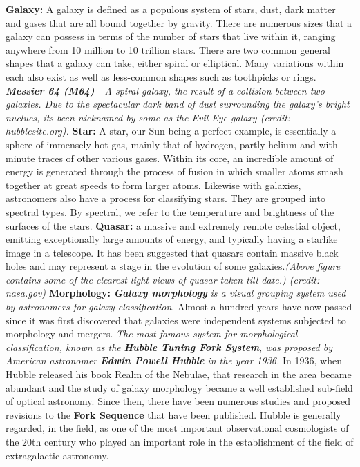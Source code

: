 \documentclass[11pt]{article}
\begin{document}
\textbf{Galaxy:} A galaxy is defined as a populous system of stars,
dust, dark matter and gases that are all bound together by gravity.
There are numerous sizes that a galaxy can possess in terms of the
number of stars that live within it, ranging anywhere from 10 million to
10 trillion stars. There are two common general shapes that a galaxy can
take, either spiral or elliptical. Many variations within each also
exist as well as less-common shapes such as toothpicks or rings.
\emph{\textbf{Messier 64 (M64)} - A spiral galaxy, the result of a
collision between two galaxies. Due to the spectacular dark band of dust
surrounding the galaxy's bright nuclues, its been nicknamed by some as
the Evil Eye galaxy (credit: hubblesite.org).} \textbf{Star:} A star,
our Sun being a perfect example, is essentially a sphere of immensely
hot gas, mainly that of hydrogen, partly helium and with minute traces
of other various gases. Within its core, an incredible amount of energy
is generated through the process of fusion in which smaller atoms smash
together at great speeds to form larger atoms. Likewise with galaxies,
astronomers also have a process for classifying stars. They are grouped
into spectral types. By spectral, we refer to the temperature and
brightness of the surfaces of the stars. \textbf{Quasar:} a massive and
extremely remote celestial object, emitting exceptionally large amounts
of energy, and typically having a starlike image in a telescope. It has
been suggested that quasars contain massive black holes and may
represent a stage in the evolution of some galaxies.\emph{(Above figure
contains some of the clearest light views of quasar taken till date.)
(credit: nasa.gov)} \textbf{Morphology:} \textbf{\emph{Galaxy
morphology}} \emph{is a visual grouping system used by astronomers for
galaxy classification}. Almost a hundred years have now passed since it
was first discovered that galaxies were independent systems subjected to
morphology and mergers. \emph{The most famous system for morphological
classification, known as the} \textbf{\emph{Hubble Tuning Fork System}},
\emph{was proposed by American astronomer \textbf{Edwin Powell Hubble}
in the year 1936.} In 1936, when Hubble released his book Realm of the
Nebulae, that research in the area became abundant and the study of
galaxy morphology became a well established sub-field of optical
astronomy. Since then, there have been numerous studies and proposed
revisions to the \textbf{Fork Sequence} that have been published. Hubble
is generally regarded, in the field, as one of the most important
observational cosmologists of the 20th century who played an important
role in the establishment of the field of extragalactic astronomy.
\end{document}
